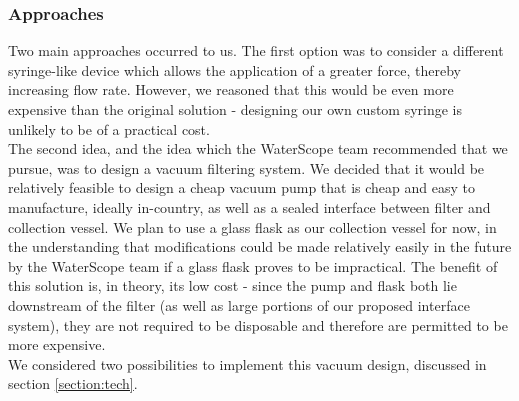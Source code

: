 \documentclass[12pt]{article}
\begin{document}
\subsubsection{Approaches}
Two main approaches occurred to us. The first option was to consider a different syringe-like device which allows the application of a greater force, thereby increasing flow rate. However, we reasoned that this would be even more expensive than the original solution - designing our own custom syringe is unlikely to be of a practical cost.\\
The second idea, and the idea which the WaterScope team recommended that we pursue, was to design a vacuum filtering system. We decided that it would be relatively feasible to design a cheap vacuum pump that is cheap and easy to manufacture, ideally in-country, as well as a sealed interface between filter and collection vessel. We plan to use a glass flask as our collection vessel for now, in the understanding that modifications could be made relatively easily in the future by the WaterScope team if a glass flask proves to be impractical. The benefit of this solution is, in theory, its low cost - since the pump and flask both lie downstream of the filter (as well as large portions of our proposed interface system), they are not required to be disposable and therefore are permitted to be more expensive.\\
We considered two possibilities to implement this vacuum design, discussed in section \ref{section:tech}.\\\par
\end{document}

